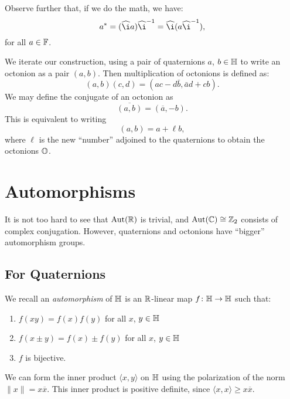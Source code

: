 Observe further that, if we do the math, we have:
\begin{equation}
a^{*} = (\widehat{\i}a)\widehat{\i}^{-1} = \widehat{\i}(a\widehat{\i}^{-1}),
\end{equation}
for all $a\in\mathbb{F}$.

We iterate our construction, using a pair of quaternions $a$, $b\in\mathbb{H}$
to write an octonion as a pair $(a, b)$. Then multiplication of
octonions is defined as:
\begin{equation}
(a, b)(c,  d) =(ac - d\bar{b}, \bar{a}d+cb).
\end{equation}
We may define the conjugate of an octonion as
\begin{equation}
\overline{(a,b)} = (\overline{a}, -b).
\end{equation}
This is equivalent to writing
\begin{equation}
(a, b) = a + \ell b,
\end{equation}
where $\ell$ is the new ``number'' adjoined to the quaternions to obtain
the octonions $\mathbb{O}$.

\section{Automorphisms}

\M
It is not too hard to see that $\operatorname{Aut}(\mathbb{R})$ is trivial, and
$\operatorname{Aut}(\mathbb{C})\cong\mathbb{Z}_{2}$ consists of complex conjugation. However,
quaternions and octonions have ``bigger'' automorphism groups. 

\subsection{For Quaternions}

 We recall an \emph{automorphism} of $\mathbb{H}$ is an
$\mathbb{R}$-linear map $f\colon\mathbb{H}\to\mathbb{H}$ such that:
\begin{enumerate}
\item $f(xy)=f(x)f(y)$ for all $x$, $y\in\mathbb{H}$
\item $f(x\pm y)=f(x)\pm f(y)$ for all $x$, $y\in\mathbb{H}$
\item $f$ is bijective.
\end{enumerate}

We can form the inner product $\langle x, y\rangle$ on $\mathbb{H}$ using the
polarization of the norm $\|x\|=x\overline{x}$. This inner product is
positive definite, since $\langle x, x\rangle\geq x\overline{x}$.

